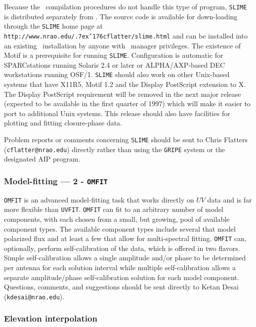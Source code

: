 Because the \AIPS\ compilation procedures do not handle this type of
program, {\tt SLIME} is distributed separately from \AIPS.  The source
code is available for down-loading through the {\tt SLIME} home page
at {\tt
http://www.nrao.edu/\lower.7ex\hbox{\char'176}cflatter/slime.html} and
can be installed into an existing \AIPS\ installation by anyone with
\AIPS\ manager privileges.  The existence of Motif is a prerequisite
for running {\tt SLIME}.  Configuration is automatic for SPARCstations
running Solaris 2.4 or later or ALPHA/AXP-based DEC workstations
running OSF/1.  {\tt SLIME} should also work on other Unix-based
systems that have X11R5, Motif 1.2 and the Display PostScript
extension to X. The Display PostScript requirement will be removed in
the next major release (expected to be available in the first quarter
of 1997) which will make it easier to port to additional Unix systems.
This release should also have facilities for plotting and fitting
closure-phase data.

Problem reports or comments concerning {\tt SLIME} should be sent to
Chris Flatters ({\tt cflatter@nrao.edu}) directly rather than using
the {\tt GRIPE} system or the designated AIP program.

\subsubsection{Model-fitting --- 2 - {\tt OMFIT}}

{\tt OMFIT} is an advanced model-fitting task that works directly on
$UV$ data and is far more flexible than {\tt UVFIT}.  {\tt OMFIT} can
fit to an arbitrary number of model components, with each chosen from
a small, but growing, pool of available component types.  The
available component types include several that model polarized flux
and at least a few that allow for multi-spectral fitting.  {\tt OMFIT}
can, optionally, perform self-calibration of the data, which is
offered in two flavors.  Simple self-calibration allows a single
amplitude and/or phase to be determined per antenna for each solution
interval while multiple self-calibration allows a separate
amplitude/phase self-calibration solution for each model component.
Questions, comments, and suggestions should be sent directly to Ketan
Desai ({\tt kdesai@nrao.edu}).

\subsubsection{Elevation interpolation}

